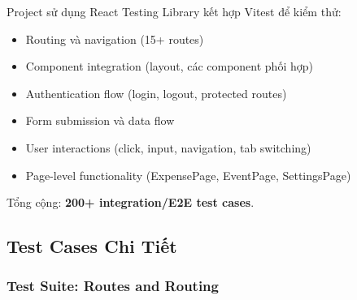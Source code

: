 \documentclass[12pt,a4paper,vietnamese]{article}
\begin{document}
Project sử dụng React Testing Library kết hợp Vitest để kiểm thử:
\begin{itemize}
    \item Routing và navigation (15+ routes)
    \item Component integration (layout, các component phối hợp)
    \item Authentication flow (login, logout, protected routes)
    \item Form submission và data flow
    \item User interactions (click, input, navigation, tab switching)
    \item Page-level functionality (ExpensePage, EventPage, SettingsPage)
\end{itemize}

Tổng cộng: \textbf{200+ integration/E2E test cases}.

\subsection{Test Cases Chi Tiết}

\subsubsection{Test Suite: Routes and Routing}
\end{document}
